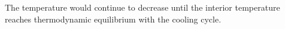 The temperature would continue to decrease until the interior temperature reaches thermodynamic equilibrium with the cooling cycle.